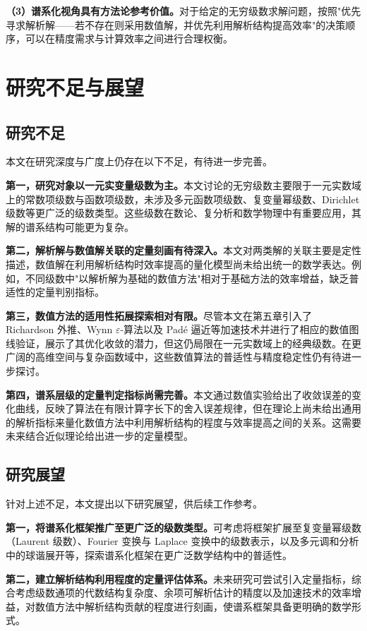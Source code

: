 \textbf{（3）谱系化视角具有方法论参考价值。}对于给定的无穷级数求解问题，按照"优先寻求解析解——若不存在则采用数值解，并优先利用解析结构提高效率"的决策顺序，可以在精度需求与计算效率之间进行合理权衡。

\section{研究不足与展望}

\subsection{研究不足}

本文在研究深度与广度上仍存在以下不足，有待进一步完善。

\textbf{第一，研究对象以一元实变量级数为主。}本文讨论的无穷级数主要限于一元实数域上的常数项级数与函数项级数，未涉及多元函数项级数、复变量幂级数、Dirichlet 级数等更广泛的级数类型。这些级数在数论、复分析和数学物理中有重要应用，其解的谱系结构可能更为复杂。

\textbf{第二，解析解与数值解关联的定量刻画有待深入。}本文对两类解的关联主要是定性描述，数值解在利用解析结构时效率提高的量化模型尚未给出统一的数学表达。例如，不同级数中"以解析解为基础的数值方法"相对于基础方法的效率增益，缺乏普适性的定量判别指标。

\textbf{第三，数值方法的适用性拓展探索相对有限。}尽管本文在第五章引入了 Richardson 外推、Wynn $\varepsilon$-算法以及 Padé 逼近等加速技术并进行了相应的数值图线验证，展示了其优化收敛的潜力，但这仍局限在一元实数域上的经典级数。在更广阔的高维空间与复杂函数域中，这些数值算法的普适性与精度稳定性仍有待进一步探讨。

\textbf{第四，谱系层级的定量判定指标尚需完善。}本文通过数值实验给出了收敛误差的变化曲线，反映了算法在有限计算字长下的舍入误差规律，但在理论上尚未给出通用的解析指标来量化数值方法中利用解析结构的程度与效率提高之间的关系。这需要未来结合近似理论给出进一步的定量模型。

\subsection{研究展望}

针对上述不足，本文提出以下研究展望，供后续工作参考。

\textbf{第一，将谱系化框架推广至更广泛的级数类型。}可考虑将框架扩展至复变量幂级数（Laurent 级数）、Fourier 变换与 Laplace 变换中的级数表示，以及多元调和分析中的球谐展开等，探索谱系化框架在更广泛数学结构中的普适性。

\textbf{第二，建立解析结构利用程度的定量评估体系。}未来研究可尝试引入定量指标，综合考虑级数通项的代数结构复杂度、余项可解析估计的精度以及加速技术的效率增益，对数值方法中解析结构贡献的程度进行刻画，使谱系框架具备更明确的数学形式。

